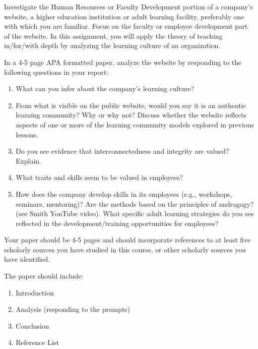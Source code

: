 \documentclass[
]{book}
\providecommand{\tightlist}{%
  \setlength{\itemsep}{0pt}\setlength{\parskip}{0pt}}
\begin{document}
\begin{assessment}
Investigate the Human Resources or Faculty Development portion of a
company's website, a higher education institution or adult learning
facility, preferably one with which you are familiar. Focus on the
faculty or employee development part of the website. In this assignment,
you will apply the theory of teaching in/for/with depth by analyzing the
learning culture of an organization.

In a 4-5 page APA formatted paper, analyze the website by responding to
the following questions in your report:

\begin{enumerate}
\def\labelenumi{\arabic{enumi}.}
\tightlist
\item
  What can you infer about the company's learning culture?
\item
  From what is visible on the public website, would you say it is an
  authentic learning community? Why or why not? Discuss whether the
  website reflects aspects of one or more of the learning community
  models explored in previous lessons.
\item
  Do you see evidence that interconnectedness and integrity are valued?
  Explain.
\item
  What traits and skills seem to be valued in employees?
\item
  How does the company develop skills in its employees (e.g., workshops,
  seminars, mentoring)? Are the methods based on the principles of
  andragogy? (see Smith YouTube video). What specific adult learning
  strategies do you see reflected in the development/training
  opportunities for employees?
\end{enumerate}

Your paper should be 4-5 pages and should incorporate references to at
least five scholarly sources you have studied in this course, or other
scholarly sources you have identified.

The paper should include:

\begin{enumerate}
\def\labelenumi{\arabic{enumi}.}
\tightlist
\item
  Introduction
\item
  Analysis (responding to the prompts)
\item
  Conclusion
\item
  Reference List
\end{enumerate}
\end{assessment}
\end{document}
